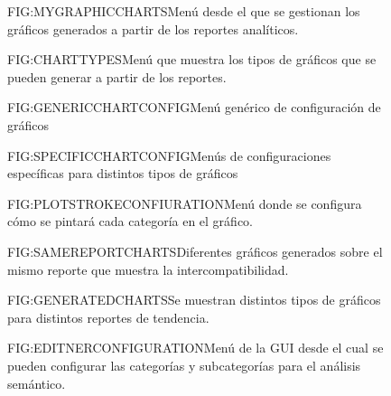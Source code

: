 \begin{figure}[Menú GUI de gestion de las gráficas]{FIG:MYGRAPHICCHARTS}{Menú desde el que se gestionan los gráficos generados a partir de los reportes analíticos.}
\end{figure}

\begin{figure}[Menú de selección de tipo de gráfico]{FIG:CHARTTYPES}{Menú que muestra los tipos de gráficos que se pueden generar a partir de los reportes.}
\end{figure}

\begin{figure}[Configuración de un gráfico (general)]{FIG:GENERICCHARTCONFIG}{Menú genérico de configuración de gráficos}
\end{figure}

\begin{figure}[Configuración de un gráfico (específico)]{FIG:SPECIFICCHARTCONFIG}{Menús de configuraciones específicas para distintos tipos de gráficos}
		 \quad
	 \quad
\end{figure}

\begin{figure}[Configuración de trazos del gráfico por categoría]{FIG:PLOTSTROKECONFIURATION}{Menú donde se configura cómo se pintará cada categoría en el gráfico.}
\end{figure}

\begin{figure}[Mismo reporte, distintos gráficos]{FIG:SAMEREPORTCHARTS}{Diferentes  gráficos generados sobre el mismo reporte que muestra la intercompatibilidad.}
 \quad
{} 
\end{figure}

\begin{figure}[Diferentes gráficos generados ]{FIG:GENERATEDCHARTS}{Se muestran distintos tipos de gráficos para distintos reportes de tendencia.}
	 \quad
\end{figure}


\begin{figure}[Editando una configuración para el análisis semántico]{FIG:EDITNERCONFIGURATION}{Menú de la GUI desde el cual se pueden configurar las categorías y subcategorías para el análisis semántico.}
\end{figure}

